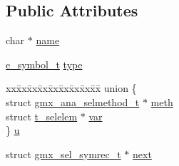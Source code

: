 \subsection*{\-Public \-Attributes}
\begin{DoxyCompactItemize}
\item 
char $\ast$ \hyperlink{structgmx__sel__symrec__t_aea6127c0ebfc57df0bce799a1e039d0e}{name}
\item 
\hyperlink{symrec_8h_a3d55b48f8dc057ea3df3fdc68ee116cb}{e\-\_\-symbol\-\_\-t} \hyperlink{structgmx__sel__symrec__t_a938572eb28083f03d102603245e30803}{type}
\item 
\begin{tabbing}
xx\=xx\=xx\=xx\=xx\=xx\=xx\=xx\=xx\=\kill
union \{\\
\>struct \hyperlink{structgmx__ana__selmethod__t}{gmx\_ana\_selmethod\_t} $\ast$ \hyperlink{structgmx__sel__symrec__t_afb394f5faec4fea6013f8b8c9f0ef3ad}{meth}\\
\>struct \hyperlink{structt__selelem}{t\_selelem} $\ast$ \hyperlink{structgmx__sel__symrec__t_a6636424751725afafe11a2a2b1a376f7}{var}\\
\} \hyperlink{structgmx__sel__symrec__t_af1438f767fb9950502cb039b0980746a}{u}\\

\end{tabbing}\item 
struct \hyperlink{structgmx__sel__symrec__t}{gmx\-\_\-sel\-\_\-symrec\-\_\-t} $\ast$ \hyperlink{structgmx__sel__symrec__t_a32967616ec7f90798abf0853b5fe93f0}{next}
\end{DoxyCompactItemize}


